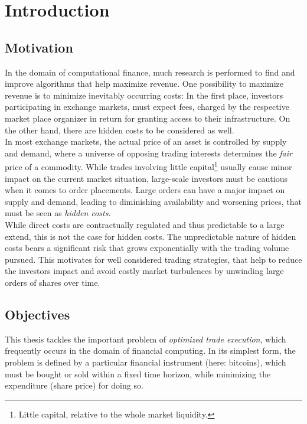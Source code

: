 \chapter{Introduction}
\label{chap:introduction}
\section{Motivation} 
\label{sec:motivation}
In the domain of computational finance, much research is performed to find and improve algorithms that help maximize revenue. One possibility to maximize revenue is to minimize inevitably occurring costs: In the first place, investors participating in exchange markets, must expect fees, charged by the respective market place organizer in return for granting access to their infrastructure. On the other hand, there are hidden costs to be considered as well.\\

In most exchange markets, the actual price of an asset is controlled by supply and demand, where a universe of opposing trading interests determines the \emph{fair} price of a commodity. While trades involving little capital\footnote{Little capital, relative to the whole market liquidity.} usually cause minor impact on the current market situation, large-scale investors must be cautious when it comes to order placements. Large orders can have a major impact on supply and demand, leading to diminishing availability and worsening prices, that must be seen as \emph{hidden costs}.\\

While direct costs are contractually regulated and thus predictable to a large extend, this is not the case for hidden costs. The unpredictable nature of hidden costs bears a significant risk that grows exponentially with the trading volume pursued. This motivates for well considered trading strategies, that help to reduce the investors impact and avoid costly market turbulences by unwinding large orders of shares over time. \\



\section{Objectives}
\label{sec:objectives}
This thesis tackles the important problem of \emph{optimized trade execution}, which frequently occurs in the domain of financial computing. In its simplest form, the problem is defined by a particular financial instrument (here: bitcoins), which must be bought or sold within a fixed time horizon, while minimizing the expenditure (share price) for doing so.\\

